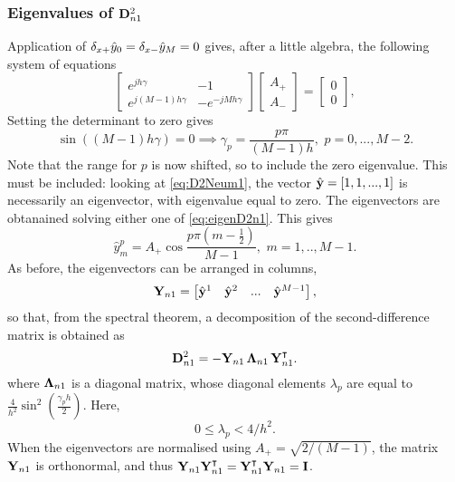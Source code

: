 \subsubsection{Eigenvalues of ${\bf D}^2_{n1}$}

Application of $\delta_{x+} \hat y_0 = \delta_{x-} \hat y_M = 0$ gives, after a little algebra, the following system of equations
\begin{equation}\label{eq:eigenD2n1}
\begin{bmatrix}
e^{jh\gamma} & -1 \\
e^{j(M-1)h\gamma} & -e^{-jMh\gamma}
\end{bmatrix}
\begin{bmatrix}
A_+ \\
A_-
\end{bmatrix}=
\begin{bmatrix}
0 \\
0
\end{bmatrix},
\end{equation}
Setting the determinant to zero gives
\begin{equation}\label{eq:EigenvaluesD2n1}
\sin ({(M-1)h\gamma}) = 0  \implies  \gamma_p = \frac{p \pi}{(M-1) h}, \,\, p = 0,...,M-2.
\end{equation}
Note that the range for $p$ is now shifted, so to include the zero eigenvalue. This must be included: looking at \eqref{eq:D2Neum1}, the vector $\hat {\bf y} = [1,1,...,1]$ is necessarily an eigenvector, with eigenvalue equal to zero. The eigenvectors are obtanained solving either one of \eqref{eq:eigenD2n1}. This gives
\begin{equation}
\hat y^p_m=A_+\cos\frac{p \pi \left( m-\frac{1}{2}\right)}{M-1}, \,\, m = 1,..,M-1.
\end{equation}
As before, the eigenvectors can be arranged in columns, 
\begin{equation}
{\bf Y}_{n1} = \begin{bmatrix}\hat {\bf y}^1 & \hat{\bf y}^2 & ... & \hat{\bf y}^{M-1}\end{bmatrix},
\end{equation}
so that, from the spectral theorem, a decomposition of the second-difference matrix is obtained as
\begin{equation}\label{eq:DecompD2n1}
{\bf D}^{2}_{n1} = -{\bf Y}_{n1} \, {\bf \Lambda}_{n1} \, {\bf Y}^\intercal_{n1}.
\end{equation}
where ${{\bf \Lambda}_{n1}}$ is a diagonal matrix, whose diagonal elements $\lambda_p$ are  equal to $\frac{4}{h^2}\sin^2 \left( \frac{\gamma_p h}{2}\right)$. Here,
\begin{equation}\label{eq:BndLambdaD2n1}
0 \leq \lambda_p < 4/h^2.
\end{equation}
When the eigenvectors are normalised using $A_+ = \sqrt{2/(M-1)}$, the matrix ${\bf Y}_{n1}$ is orthonormal, and thus ${\bf Y}_{n1} {\bf Y}_{n1}^{\intercal}={\bf Y}_{n1}^\intercal {\bf Y}_{n1} = {\bf I}$.


